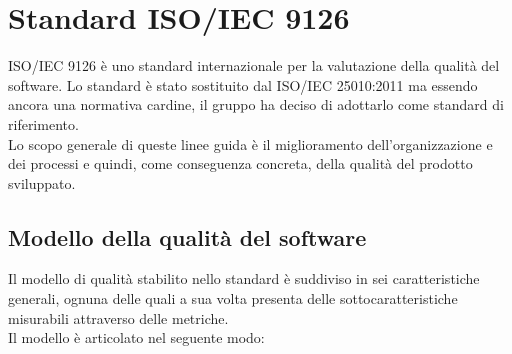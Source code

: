 \section{Standard ISO/IEC 9126}
ISO/IEC 9126 è uno standard internazionale per la valutazione della qualità del software. Lo standard è stato sostituito dal ISO/IEC 25010:2011 ma essendo ancora una normativa cardine, il gruppo \Omicron ha deciso di adottarlo come standard di riferimento. \\
Lo scopo generale di queste linee guida è il miglioramento dell'organizzazione e dei processi e quindi, come conseguenza concreta, della qualità del prodotto sviluppato.

\subsection{Modello della qualità del software}
Il modello di qualità stabilito nello standard è suddiviso in sei caratteristiche generali, ognuna delle quali a sua volta presenta delle sottocaratteristiche misurabili attraverso delle metriche. \\
Il modello è articolato nel seguente modo:
